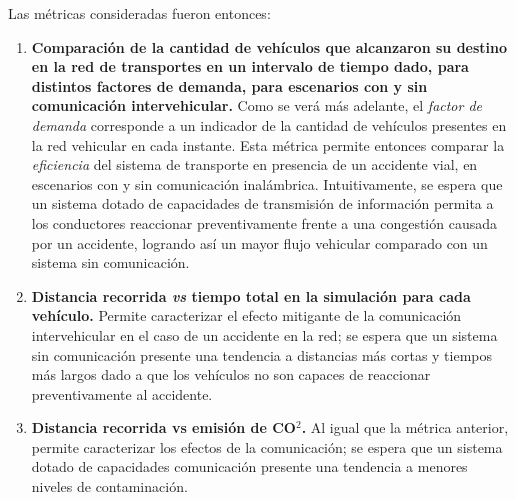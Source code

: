 Las métricas consideradas fueron entonces:

\begin{enumerate}
    \item \textbf{Comparación de la cantidad de vehículos que alcanzaron su destino en la red de transportes en un intervalo de tiempo dado, para distintos factores de demanda, para escenarios con y sin comunicación intervehicular.} Como se verá más adelante, el \emph{factor de demanda} corresponde a un indicador de la cantidad de vehículos presentes en la red vehicular en cada instante. Esta métrica permite entonces comparar la \emph{eficiencia} del sistema de transporte en presencia de un accidente vial, en escenarios con y sin comunicación inalámbrica. Intuitivamente, se espera que un sistema dotado de capacidades de transmisión de información permita a los conductores reaccionar preventivamente frente a una congestión causada por un accidente, logrando así un mayor flujo vehicular comparado con un sistema sin comunicación. 
    
    \item \textbf{Distancia recorrida \emph{vs} tiempo total en la simulación para cada vehículo.} Permite caracterizar el efecto mitigante de la comunicación intervehicular en el caso de un accidente en la red; se espera que un sistema sin comunicación presente una tendencia a distancias más cortas y tiempos más largos dado a que los vehículos no son capaces de reaccionar preventivamente al accidente.
    
    \item \textbf{Distancia recorrida vs emisión de CO$^{2}$.} Al igual que la métrica anterior, permite caracterizar los efectos de la comunicación; se espera que un sistema dotado de capacidades comunicación presente una tendencia a menores niveles de contaminación.
\end{enumerate}